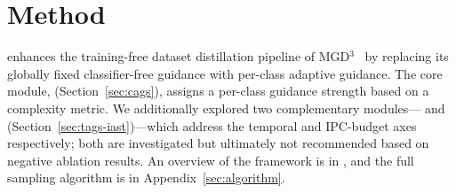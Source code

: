 \section{Method}
\label{sec:method}

\ags{} enhances the training-free dataset distillation pipeline of MGD$^3$~\cite{chansantiago2025modeguided} by replacing its globally fixed classifier-free guidance with per-class adaptive guidance. The core module, \cags{} (Section~\ref{sec:cags}), assigns a per-class guidance strength based on a complexity metric. We additionally explored two complementary modules---\tags{} and \iast{} (Section~\ref{sec:tags-iast})---which address the temporal and IPC-budget axes respectively; both are investigated but ultimately not recommended based on negative ablation results. An overview of the framework is in , and the full sampling algorithm is in Appendix~\ref{sec:algorithm}.

